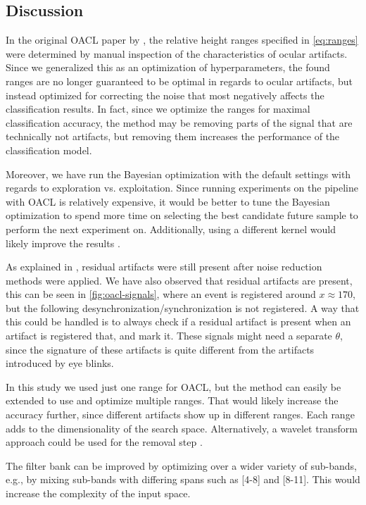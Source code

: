 \subsection{Discussion}\label{sec:discussion}
In the original OACL paper by \citep{li2015ocular}, the relative height ranges specified in \cref{eq:ranges} were determined by manual inspection of the characteristics of ocular artifacts. Since we generalized this as an optimization of hyperparameters, the found ranges are no longer guaranteed to be optimal in regards to ocular artifacts, but instead optimized for correcting the noise that most negatively affects the classification results. In fact, since we optimize the ranges for maximal classification accuracy, the method may be removing parts of the signal that are technically not artifacts, but removing them increases the performance of the classification model.

Moreover, we have run the Bayesian optimization with the default settings with regards to exploration vs. exploitation. Since running experiments on the pipeline with OACL is relatively expensive, it would be better to tune the Bayesian optimization to spend more time on selecting the best candidate future sample to perform the next experiment on. Additionally, using a different kernel would likely improve the results \citep{snoek2012practical}.

As explained in \cite{hoffmann2008correction}, residual artifacts were still present after noise reduction methods were applied. We have also observed that residual artifacts are present, this can be seen in \cref{fig:oacl-signals}, where an event is registered around $x \approx 170$, but the following desynchronization/synchronization is not registered. A way that this could be handled is to always check if a residual artifact is present when an artifact is registered that, and mark it. These signals might need a separate $\theta$, since the signature of these artifacts is quite different from the artifacts introduced by eye blinks.

In this study we used just one range for OACL, but the method can easily be extended to use and optimize multiple ranges. That would likely increase the accuracy further, since different artifacts show up in different ranges. Each range adds to the dimensionality of the search space. Alternatively, a wavelet transform approach could be used for the removal step \citep{krishnaveni2006automatic}.

The filter bank can be improved by optimizing over a wider variety of sub-bands, e.g., by mixing sub-bands with differing spans such as [4-8] and [8-11]. This would increase the complexity of the input space.